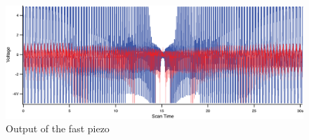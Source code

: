 \begin{figure}[H]
  \centering
  \includegraphics[scale=0.4]{images/tiltcorrectiongraph.eps}
    \caption{Output of the fast piezo}
  \label{spiralzfast}
\end{figure}


